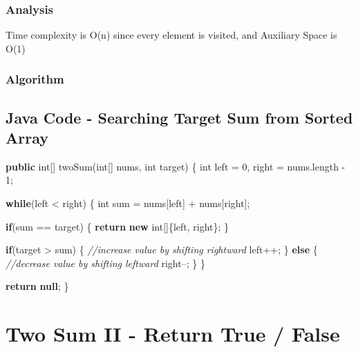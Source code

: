 \documentclass[]{book}
\newenvironment{Shaded}{\begin{snugshade}}{\end{snugshade}}
\newcommand{\CommentTok}[1]{\textcolor[rgb]{0.56,0.35,0.01}{\textit{#1}}}
\newcommand{\DataTypeTok}[1]{\textcolor[rgb]{0.13,0.29,0.53}{#1}}
\newcommand{\DecValTok}[1]{\textcolor[rgb]{0.00,0.00,0.81}{#1}}
\newcommand{\FunctionTok}[1]{\textcolor[rgb]{0.00,0.00,0.00}{#1}}
\newcommand{\KeywordTok}[1]{\textcolor[rgb]{0.13,0.29,0.53}{\textbf{#1}}}
\newcommand{\NormalTok}[1]{#1}
\begin{document}
\hypertarget{analysis-1}{%
\subsubsection{Analysis}\label{analysis-1}}

Time complexity is O(n) since every element is visited, and Auxiliary Space is O(1)

\hypertarget{algorithm-1}{%
\subsubsection{Algorithm}\label{algorithm-1}}

\hypertarget{java-code---searching-target-sum-from-sorted-array}{%
\subsection{Java Code - Searching Target Sum from Sorted Array}\label{java-code---searching-target-sum-from-sorted-array}}

\begin{Shaded}
\begin{Highlighting}[]
\KeywordTok{public} \DataTypeTok{int}\NormalTok{[] }\FunctionTok{twoSum}\NormalTok{(}\DataTypeTok{int}\NormalTok{[] nums, }\DataTypeTok{int}\NormalTok{ target) \{}
    \DataTypeTok{int}\NormalTok{ left = }\DecValTok{0}\NormalTok{, right = nums.}\FunctionTok{length}\NormalTok{ - }\DecValTok{1}\NormalTok{;}

    \KeywordTok{while}\NormalTok{(left < right) \{}
        \DataTypeTok{int}\NormalTok{ sum = nums[left] + nums[right];}

        \KeywordTok{if}\NormalTok{(sum == target) \{}
            \KeywordTok{return} \KeywordTok{new} \DataTypeTok{int}\NormalTok{[]\{left, right\};}
\NormalTok{        \}}

        \KeywordTok{if}\NormalTok{(target > sum) \{}
            \CommentTok{//increase value by shifting rightward}
\NormalTok{            left++;}
\NormalTok{        \} }\KeywordTok{else}\NormalTok{ \{}
            \CommentTok{//decrease value by shifting leftward}
\NormalTok{            right--;}
\NormalTok{        \}}
\NormalTok{    \}}

    \KeywordTok{return} \KeywordTok{null}\NormalTok{;}
\NormalTok{\}}
\end{Highlighting}
\end{Shaded}

\hypertarget{two-sum-ii---return-true-false}{%
\section{Two Sum II - Return True / False}\label{two-sum-ii---return-true-false}}
\end{document}
